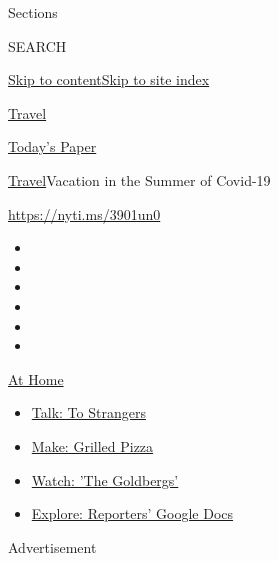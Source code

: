 Sections

SEARCH

\protect\hyperlink{site-content}{Skip to
content}\protect\hyperlink{site-index}{Skip to site index}

\href{https://www.nytimes.com/section/travel}{Travel}

\href{https://myaccount.nytimes.com/auth/login?response_type=cookie\&client_id=vi}{}

\href{https://www.nytimes.com/section/todayspaper}{Today's Paper}

\href{/section/travel}{Travel}\textbar{}Vacation in the Summer of
Covid-19

\url{https://nyti.ms/3901un0}

\begin{itemize}
\item
\item
\item
\item
\item
\item
\end{itemize}

\href{https://www.nytimes.com/spotlight/at-home?action=click\&pgtype=Article\&state=default\&region=TOP_BANNER\&context=at_home_menu}{At
Home}

\begin{itemize}
\tightlist
\item
  \href{https://www.nytimes.com/2020/08/03/well/family/the-benefits-of-talking-to-strangers.html?action=click\&pgtype=Article\&state=default\&region=TOP_BANNER\&context=at_home_menu}{Talk:
  To Strangers}
\item
  \href{https://www.nytimes.com/2020/08/01/at-home/coronavirus-make-pizza-on-a-grill.html?action=click\&pgtype=Article\&state=default\&region=TOP_BANNER\&context=at_home_menu}{Make:
  Grilled Pizza}
\item
  \href{https://www.nytimes.com/2020/07/31/arts/television/goldbergs-abc-stream.html?action=click\&pgtype=Article\&state=default\&region=TOP_BANNER\&context=at_home_menu}{Watch:
  'The Goldbergs'}
\item
  \href{https://www.nytimes.com/interactive/2020/at-home/even-more-reporters-editors-diaries-lists-recommendations.html?action=click\&pgtype=Article\&state=default\&region=TOP_BANNER\&context=at_home_menu}{Explore:
  Reporters' Google Docs}
\end{itemize}

Advertisement

